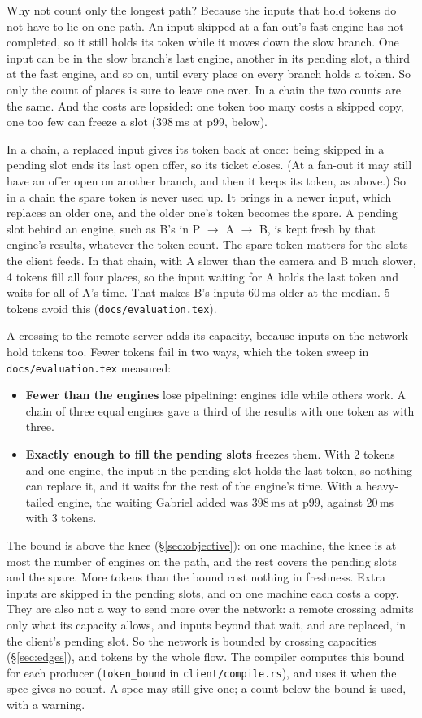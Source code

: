 \documentclass[11pt]{article}
\newcommand{\code}[1]{\texttt{#1}}
\begin{document}
Why not count only the longest path? Because the inputs that hold tokens do
not have to lie on one path. An input skipped at a fan-out's fast engine has
not completed, so it still holds its token while it moves down the slow
branch. One input can be in the slow branch's last engine, another in its
pending slot, a third at the fast engine, and so on, until every place on
every branch holds a token. So only the count of places is sure to leave one
over. In a chain the two counts are the same. And the costs are lopsided: one
token too many costs a skipped copy, one too few can freeze a slot (398\,ms
at p99, below).

In a chain, a replaced input gives its token back at once: being skipped
in a pending slot ends its last open offer, so its ticket closes. (At a
fan-out it may still have an offer open on another branch, and then it keeps
its token, as above.) So in a chain the spare token is never used up. It
brings in a newer input, which replaces an older one, and the older one's
token becomes the spare. A pending slot behind an engine,
such as B's in P $\to$ A $\to$ B, is kept fresh by that engine's results,
whatever the token count. The spare token matters for the slots the client
feeds. In that chain, with A slower than the camera and B much slower, 4
tokens fill all four places, so the input waiting for A holds the last token
and waits for all of A's time. That makes B's inputs 60\,ms older at the
median. 5 tokens avoid this (\code{docs/evaluation.tex}).

A crossing to the remote server adds its
capacity, because inputs on the network hold tokens too. Fewer tokens fail in two ways, which
the token sweep in \code{docs/evaluation.tex} measured:
\begin{itemize}[nosep]
  \item \textbf{Fewer than the engines} lose pipelining: engines idle while
        others work. A chain of three equal engines gave a third of the
        results with one token as with three.
  \item \textbf{Exactly enough to fill the pending slots} freezes them. With
        2 tokens and one engine, the input in the pending slot holds the last
        token, so nothing can replace it, and it waits for the rest of the
        engine's time. With a heavy-tailed engine, the waiting Gabriel added
        was 398\,ms at p99, against 20\,ms with 3 tokens.
\end{itemize}
The bound is above the knee (\S\ref{sec:objective}): on one machine, the
knee is at most the number of engines on the path, and the rest covers the
pending slots and the spare. More tokens than the bound cost nothing in
freshness. Extra inputs are
skipped in the pending slots, and on one machine each costs a copy. They are
also not a way to send more over the network: a remote crossing admits only
what its capacity allows, and inputs beyond that wait, and are replaced, in
the client's pending slot. So the network is bounded by crossing capacities
(\S\ref{sec:edges}), and tokens by the whole flow. The compiler computes
this bound for each producer (\code{token\_bound} in
\code{client/compile.rs}), and uses it when the spec gives no count. A spec
may still give one; a count below the bound is used, with a warning.
\end{document}

